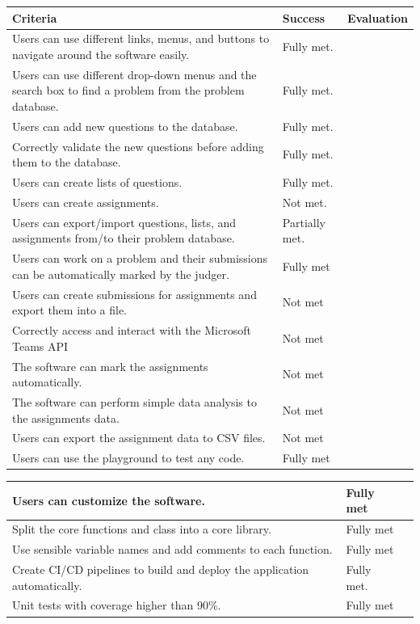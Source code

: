 \documentclass[a4paper]{report}
\begin{document}
\begin{tabulary}{\linewidth}{|L|l|L|}
    \hline
    Criteria & Success & Evaluation \\
    \hline
    Users can use different links, menus, and buttons to navigate around the software easily. & Fully met. & \\
    \hline
    Users can use different drop-down menus and the search box to find a problem from the problem database. & Fully met. & \\
    \hline
    Users can add new questions to the database. & Fully met. & \\
    \hline
    Correctly validate the new questions before adding them to the database. & Fully met. & \\
    \hline
    Users can create lists of questions. & Fully met. & \\
    \hline
    Users can create assignments. & Not met. & \\
    \hline
    Users can export/import questions, lists, and assignments from/to their problem database. & Partially met. & \\
    \hline
    Users can work on a problem and their submissions can be automatically marked by the judger. & Fully met & \\
    \hline
    Users can create submissions for assignments and export them into a file. & Not met & \\
    \hline
    Correctly access and interact with the Microsoft Teams API & Not met & \\
    \hline
    The software can mark the assignments automatically. & Not met & \\
    \hline
    The software can perform simple data analysis to the assignments data. & Not met & \\
    \hline
    Users can export the assignment data to CSV files. & Not met & \\
    \hline
    Users can use the playground to test any code. & Fully met & \\
    \hline
\end{tabulary}

\begin{tabulary}{\linewidth}{|L|l|L|}
    \hline
    Users can customize the software. & Fully met & \\
    \hline
    Split the core functions and class into a core library. & Fully met & \\
    \hline
    Use sensible variable names and add comments to each function. & Fully met & \\
    \hline
    Create CI/CD pipelines to build and deploy the application automatically. & Fully met. & \\
    \hline
    Unit tests with coverage higher than 90\%. & Fully met & \\
    \hline
\end{tabulary}
\end{document}

